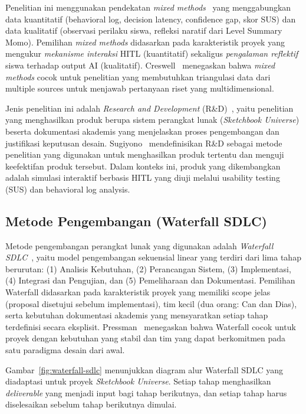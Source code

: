 \documentclass[12pt,a4paper,oneside,openany]{report}
\begin{document}
Penelitian ini menggunakan pendekatan \textit{mixed methods}~\cite{ref13} yang menggabungkan data kuantitatif (behavioral log, decision latency, confidence gap, skor SUS) dan data kualitatif (observasi perilaku siswa, refleksi naratif dari Level Summary Momo). Pemilihan \textit{mixed methods} didasarkan pada karakteristik proyek yang mengukur \textit{mekanisme interaksi} HITL (kuantitatif) sekaligus \textit{pengalaman reflektif} siswa terhadap output AI (kualitatif). Creswell~\cite{ref13} menegaskan bahwa \textit{mixed methods} cocok untuk penelitian yang membutuhkan triangulasi data dari multiple sources untuk menjawab pertanyaan riset yang multidimensional.

Jenis penelitian ini adalah \textit{Research and Development} (R\&D)~\cite{ref12}, yaitu penelitian yang menghasilkan produk berupa sistem perangkat lunak (\textit{Sketchbook Universe}) beserta dokumentasi akademis yang menjelaskan proses pengembangan dan justifikasi keputusan desain. Sugiyono~\cite{ref12} mendefinisikan R\&D sebagai metode penelitian yang digunakan untuk menghasilkan produk tertentu dan menguji keefektifan produk tersebut. Dalam konteks ini, produk yang dikembangkan adalah simulasi interaktif berbasis HITL yang diuji melalui usability testing (SUS) dan behavioral log analysis.

\subsection{Metode Pengembangan (Waterfall SDLC)}
\label{subsec:metode-pengembangan}

Metode pengembangan perangkat lunak yang digunakan adalah \textit{Waterfall SDLC}~\cite{ref9}\cite{ref10}, yaitu model pengembangan sekuensial linear yang terdiri dari lima tahap berurutan: (1) Analisis Kebutuhan, (2) Perancangan Sistem, (3) Implementasi, (4) Integrasi dan Pengujian, dan (5) Pemeliharaan dan Dokumentasi. Pemilihan Waterfall didasarkan pada karakteristik proyek yang memiliki scope jelas (proposal disetujui sebelum implementasi), tim kecil (dua orang: Can dan Dias), serta kebutuhan dokumentasi akademis yang mensyaratkan setiap tahap terdefinisi secara eksplisit. Pressman~\cite{ref9} menegaskan bahwa Waterfall cocok untuk proyek dengan kebutuhan yang stabil dan tim yang dapat berkomitmen pada satu paradigma desain dari awal.

Gambar~\ref{fig:waterfall-sdlc} menunjukkan diagram alur Waterfall SDLC yang diadaptasi untuk proyek \textit{Sketchbook Universe}. Setiap tahap menghasilkan \textit{deliverable} yang menjadi input bagi tahap berikutnya, dan setiap tahap harus diselesaikan sebelum tahap berikutnya dimulai.
\end{document}
